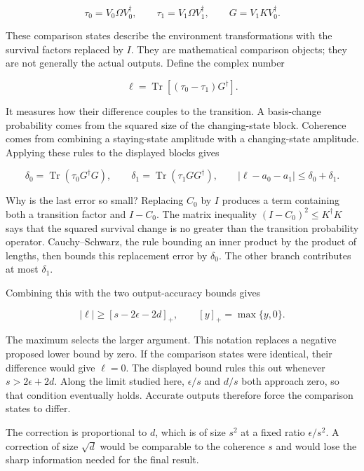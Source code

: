 \documentclass[11pt,letterpaper]{article}
\begin{document}
\[\tau_{0} = V_{0}\Omega V_{0}^{\dagger},\quad\quad\tau_{1} = V_{1}\Omega V_{1}^{\dagger},\quad\quad G = V_{1}KV_{0}^{\dagger}.\]

These comparison states describe the environment transformations with the survival factors replaced by \(I\). They are mathematical comparison objects; they are not generally the actual outputs. Define the complex number

\[\ell = \operatorname{Tr}\left\lbrack \left( \tau_{0} - \tau_{1} \right)G^{\dagger} \right\rbrack.\]

It measures how their difference couples to the transition. A basis-change probability comes from the squared size of the changing-state block. Coherence comes from combining a staying-state amplitude with a changing-state amplitude. Applying these rules to the displayed blocks gives

\[\delta_{0} = \operatorname{Tr}\left( \tau_{0}G^{\dagger}G \right),\quad\quad\delta_{1} = \operatorname{Tr}\left( \tau_{1}GG^{\dagger} \right),\quad\quad\left| \ell - a_{0} - a_{1} \right| \leq \delta_{0} + \delta_{1}.\]

Why is the last error so small? Replacing \(C_{0}\) by \(I\) produces a term containing both a transition factor and \(I - C_{0}\). The matrix inequality \(\left( I - C_{0} \right)^{2} \leq K^{\dagger}K\) says that the squared survival change is no greater than the transition probability operator. Cauchy--Schwarz, the rule bounding an inner product by the product of lengths, then bounds this replacement error by \(\delta_{0}\). The other branch contributes at most \(\delta_{1}\).

Combining this with the two output-accuracy bounds gives

\[|\ell| \geq [s-2\epsilon-2d]_{+},\quad\quad[y]_{+} = \max\{ y,0\}.\]

The maximum selects the larger argument. This notation replaces a negative proposed lower bound by zero. If the comparison states were identical, their difference would give \(\ell = 0\). The displayed bound rules this out whenever \(s > 2\epsilon + 2d\). Along the limit studied here, \(\epsilon/s\) and \(d/s\) both approach zero, so that condition eventually holds. Accurate outputs therefore force the comparison states to differ.

The correction is proportional to \(d\), which is of size \(s^{2}\) at a fixed ratio \(\epsilon/s^{2}\). A correction of size \(\sqrt{d}\) would be comparable to the coherence \(s\) and would lose the sharp information needed for the final result.
\end{document}
